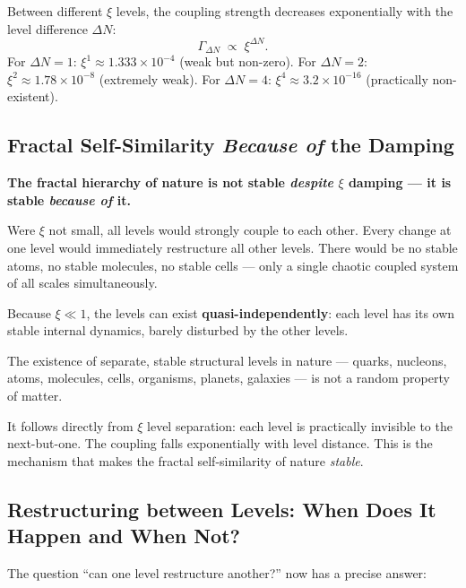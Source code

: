 Between different $\xi$ levels, the coupling strength decreases
exponentially with the level difference $\Delta N$:
\begin{equation}
  \Gamma_{\Delta N} \;\propto\; \xi^{\Delta N}.
\end{equation}
For $\Delta N = 1$: $\xi^1 \approx 1.333 \times 10^{-4}$ (weak but non-zero).
For $\Delta N = 2$: $\xi^2 \approx 1.78 \times 10^{-8}$ (extremely weak).
For $\Delta N = 4$: $\xi^4 \approx 3.2 \times 10^{-16}$ (practically non-existent).

\subsection{Fractal Self-Similarity \emph{Because of} the Damping}

\textbf{The fractal hierarchy of nature is not stable
\emph{despite} $\xi$ damping --- it is stable
\emph{because of} it.}

Were $\xi$ not small, all levels would
strongly couple to each other.
Every change at one level would immediately
restructure all other levels.
There would be no stable atoms, no stable molecules,
no stable cells --- only a single
chaotic coupled system of all scales simultaneously.

Because $\xi \ll 1$, the levels can
exist \textbf{quasi-independently}:
each level has its own stable internal dynamics,
barely disturbed by the other levels.

\begin{foundation}
The existence of separate, stable structural levels
in nature --- quarks, nucleons, atoms,
molecules, cells, organisms, planets, galaxies ---
is not a random property of matter.

It follows directly from $\xi$ level separation:
each level is practically invisible to the next-but-one.
The coupling falls exponentially with level distance.
This is the mechanism that makes the fractal
self-similarity of nature \emph{stable}.
\end{foundation}

\subsection{Restructuring between Levels:
  When Does It Happen and When Not?}

The question ``can one level restructure another?''
now has a precise answer:

